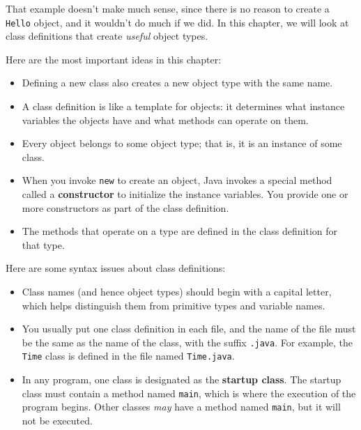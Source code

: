 \documentclass[12pt]{book}
\theoremstyle{definition}
\begin{document}
That example doesn't make much sense, since there is no
reason to create a {\tt Hello} object, and it wouldn't do
much if we did.  In this chapter, we
will look at class definitions that create
{\em useful} object types.

Here are the most important ideas in this chapter:

\begin{itemize}

\item Defining a new class also creates a new object type
with the same name.

\item A class definition is like a template for objects:
it determines what instance variables the objects have and
what methods can operate on them.

\item Every object belongs to some object type; that is, it
is an instance of some class.

\item When you invoke {\tt new} to create an object, Java
invokes a special method called a {\bf constructor} to initialize the
instance variables.  You provide one or more constructors as part of
the class definition.

\item The methods that operate on a type are defined in the
class definition for that type.

\end{itemize}

Here are some syntax issues about class definitions:

\begin{itemize}

\item Class names (and hence object types) should begin with a capital
letter, which helps distinguish them from primitive types and variable
names.

\item You usually put one class definition in each file, and the name
of the file must be the same as the name of the class, with the suffix
{\tt .java}.  For example, the {\tt Time} class is defined in the file
named {\tt Time.java}.

\item In any program, one class is designated as the {\bf startup
class}.  The startup class must contain a method named {\tt main}, which
is where the execution of the program begins.  Other classes {\em may}
have a method named {\tt main}, but it will not be executed.

\end{itemize}
\end{document}
